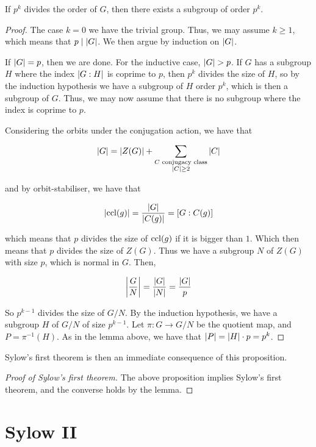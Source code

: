 \documentclass{article}
\begin{document}
    \begin{proposition*}
        If $p^k$ divides the order of $G$, then there exists a subgroup of order $p^k$.
    \end{proposition*}

    \begin{proof}
        The case $k = 0$ we have the trivial group. Thus, we may assume $k \ge 1$, which means that $p \mid \abs{G}$. We then argue by induction on $\abs{G}$.

        If $\abs{G} = p$, then we are done. For the inductive case, $\abs{G} > p$. If $G$ has a subgroup $H$ where the index $\abs{G : H}$ is coprime to $p$, then $p^k$ divides the size of $H$, so by the induction hypothesis we have a subgroup of $H$ order $p^k$, which is then a subgroup of $G$. Thus, we may now assume that there is no subgroup where the index is coprime to $p$.

        Considering the orbits under the conjugation action, we have that

        $$\abs{G} = \abs{Z(G)} + \sum_{\substack{C \text{ conjugacy class}\\ \abs{C} \ge 2}} \abs{C}$$

        and by orbit-stabiliser, we have that

        $$\abs{\operatorname{ccl}(g)} = \dfrac{\abs{G}}{\abs{C(g)}} = [G : C(g)]$$

        which means that $p$ divides the size of $\operatorname{ccl}(g)$ if it is bigger than $1$. Which then means that $p$ divides the size of $Z(G)$. Thus we have a subgroup $N$ of $Z(G)$ with size $p$, which is normal in $G$. Then,

        $$\abs{\frac{G}{N}} = \frac{\abs{G}}{\abs{N}} = \frac{\abs{G}}{p}$$

        So $p^{k-1}$ divides the size of $G/N$. By the induction hypothesis, we have a subgroup $H$ of $G/N$ of size $p^{k-1}$. Let $\pi : G \to G/N$ be the quotient map, and $P = \pi^{-1}(H)$. As in the lemma above, we have that $\abs{P} = \abs{H} \cdot p = p^k$.
    \end{proof}

    Sylow's first theorem is then an immediate consequence of this proposition.

    \begin{proof}
        [Proof of Sylow's first theorem] The above proposition implies Sylow's first theorem, and the converse holds by the lemma.
    \end{proof}

    \section{Sylow II}
\end{document}
